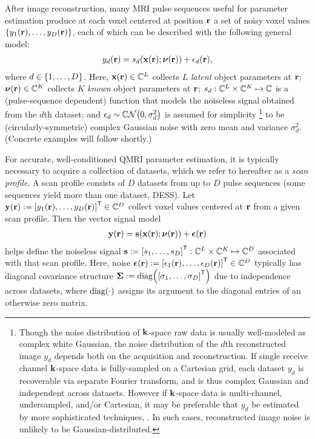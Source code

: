 After image reconstruction,
many MRI pulse sequences
useful for parameter estimation
produce at each voxel 
centered at position $\mathbf{r}$
a set of noisy voxel values 
$\set{y_1\pr,\dots,y_D\pr}$, 
each of which can be described
with the following general model:
\begin{align}
	y_d\pr = s_d\paren{\bmx\pr; \bmnu\pr} + \epsilon_d\pr,
	\label{eq:relax,mod-scalar}
\end{align}
where 
$d \in \set{1,\dots,D}$. 
Here,
$\bmx\pr \in \complexes{L}$ 
collects $L$ \emph{latent} object parameters at $\mathbf{r}$;
$\bmnu\pr \in \complexes{K}$ 
collects $K$ \emph{known} object parameters at $\mathbf{r}$;
$s_d : \mathbb{C}^{L} \times \mathbb{C}^{K} \mapsto \mathbb{C}$
is a (pulse-sequence dependent) function
that models the noiseless signal 
obtained from the $d$th dataset;
and $\epsilon_d \sim \cgauss{0}{\sigma_d^2}$ 
is assumed for simplicity 
\footnote{Though the noise distribution 
of $\mathbf{k}$-space raw data 
is usually well-modeled
as complex white Gaussian, 
the noise distribution 
of the $d$th reconstructed image $y_d$ depends both
on the acquisition and reconstruction.
If single receive channel $\mathbf{k}$-space data
is fully-sampled
on a Cartesian grid,
each dataset $y_d$ is recoverable
via separate Fourier transform,
and is thus complex Gaussian
and independent across datasets.
However if $\mathbf{k}$-space data
is multi-channel, undersampled, and/or Cartesian,
it may be preferable
that $y_d$ be estimated by more sophisticated techniques,
\eg \cite{fessler:03:nff, muckley:15:fpm}.
In such cases,
reconstructed image noise is unlikely
to be Gaussian-distributed.
}
to be (circularly-symmetric) complex Gaussian noise
\cite{macovski:96:nim, lei:07:som}
with zero mean and variance $\sigma_d^2$.
(Concrete examples will follow shortly.)

For accurate, well-conditioned QMRI parameter estimation,
it is typically necessary 
to acquire a collection of datasets,
which we refer to hereafter as a \emph{scan profile}.
A scan profile consists 
of $D$ datasets
from up to $D$ pulse sequences
(some sequences yield more than one dataset, \eg DESS).
Let 
$\bmy\pr := \brac{y_1\pr, \dots, y_D\pr}\tpose \in \complexes{D}$
collect voxel values centered at $\mathbf{r}$
from a given scan profile.
Then the vector signal model
\begin{align}
	\bmy\pr = \bms\paren{\bmx\pr; \bmnu\pr} + \bmeps\pr
	\label{eq:relax,scalar}
\end{align}
helps define the noiseless signal
$\bms := \brac{s_1, \dots, s_D}\tpose
: \complexes{L} \times \complexes{K} \mapsto \complexes{D}$
associated with that scan profile.
Here, noise
$\bmeps\pr := \brac{\epsilon_1\pr, \dots, \epsilon_D\pr}\tpose \in \complexes{D}$
typically has diagonal covariance structure
$\bmSig := \diag{\brac{\sigma_1,\dots,\sigma_D}\tpose}$
due to independence across datasets,
where $\diag{\cdot}$ assigns its argument 
to the diagonal entries 
of an otherwise zero matrix.

